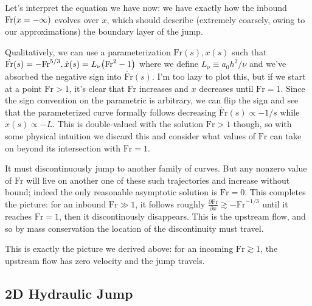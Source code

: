 \documentclass[11pt,
        usenames, %
        dvipsnames %
    ]{report}
\newcommand*{\pd}[2]{\frac{\partial#1}{\partial#2}}
\DeclarePairedDelimiter\p{\lparen}{\rparen}
\begin{document}
Let's interpret the equation we have now: we have exactly how the inbound
$\mathrm{Fr}\p*{x = -\infty}$ evolves over $x$, which should describe (extremely
coarsely, owing to our approximations) the boundary layer of the jump.

Qualitatively, we can use a parameterization $\mathrm{Fr}(s), x(s)$ such that
$\dot{\mathrm{Fr}}(s) = -\mathrm{Fr}^{5/3}, \dot{x}(s) = L_\nu \p*{\mathrm{Fr}^2
- 1}$ where we define $L_\nu \equiv a_0h^2/\nu$ and we've absorbed the negative
sign into $\dot{\mathrm{Fr}}(s)$. I'm too lazy to plot this, but if we start at
a point $\mathrm{Fr} > 1$, it's clear that $\mathrm{Fr}$ increases and $x$
decreases until $\mathrm{Fr} = 1$. Since the sign convention on the parametric
is arbitrary, we can flip the sign and see that the parameterized curve formally
follows decreasing $\dot{\mathrm{Fr}}(s) \propto -1/s$ while $\dot{x}(s) \propto
-L$. This is double-valued with the solution $\mathrm{Fr} > 1$ though, so with
some physical intuition we discard this and consider what values of
$\mathrm{Fr}$ can take on beyond its intersection with $\mathrm{Fr} = 1$.

It must discontinuously jump to another family of curves. But any nonzero value
of $\mathrm{Fr}$ will live on another one of these such trajectories and
increase without bound; indeed the only reasonable asymptotic solution is
$\mathrm{Fr} = 0$. This completes the picture: for an inbound $\mathrm{Fr} \gg
1$, it follows roughly $\pd{\mathrm{Fr}}{x} \gtrsim -\mathrm{Fr}^{-1/3}$ until
it reaches $\mathrm{Fr} = 1$, then it discontinously disappears. This is the
upstream flow, and so by mass conservation the location of the discontinuity
must travel.

This is exactly the picture we derived above: for an incoming $\mathrm{Fr}
\gtrsim 1$, the upstream flow has zero velocity and the jump travels.

\subsection{2D Hydraulic Jump}
\end{document}
